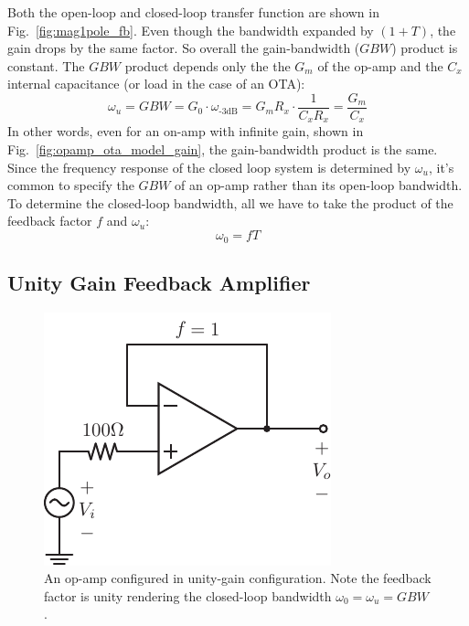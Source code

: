 Both the open-loop and closed-loop transfer function are shown in Fig.~\ref{fig:mag1pole_fb}.  Even though the bandwidth expanded by $(1+T)$, the gain drops by the same factor. So overall the gain-bandwidth ($GBW$) product is constant. The $GBW$ product depends only the the $G_m$ of the op-amp and the $C_x$ internal capacitance (or load in the case of an OTA):
%
\begin{equation}
	\omega_u = GBW = G_0 \cdot \omega_{\text{-3dB}}  = G_m R_x \cdot \frac{1}{C_x R_x} = \frac{G_m}{C_x}
\end{equation} 
%
In other words, even for an on-amp with infinite gain, shown in Fig.~\ref{fig:opamp_ota_model_gain}, the gain-bandwidth product is the same.  Since the frequency response of the closed loop system is determined by $\omega_u$, it's common to specify the $GBW$ of an op-amp rather than its open-loop bandwidth.  To determine the closed-loop bandwidth, all we have to take the product of the feedback factor $f$ and $\omega_u$:
%
\begin{equation}
	\omega_0 = f T
\end{equation} 


\subsection{Unity Gain Feedback Amplifier}

\begin{figure}[tb]
\begin{center}
\includegraphics[scale=1]{opamp_unitygain}
\end{center}
\caption{An op-amp configured in unity-gain configuration.  Note the feedback factor is unity rendering the closed-loop bandwidth $\omega_0 = \omega_u = GBW$.} \label{fig:opamp_unitygain}
\end{figure}
 
